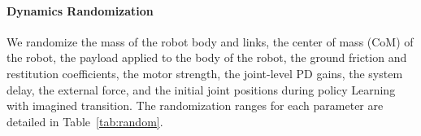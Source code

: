 \paragraph{Dynamics Randomization} We randomize the mass of the robot body and links, the center of mass (CoM) of the robot, the payload applied to the body of the robot, the ground friction and restitution coefficients, the motor strength, the joint-level PD gains, the system delay, the external force, and the initial joint positions during policy Learning with imagined transition. The randomization ranges for each parameter are detailed in Table~\ref{tab:random}.

\begin{table}[h]
    \centering
    \caption{Domain Randomization.}
    \label{tab:random}
\end{table}


